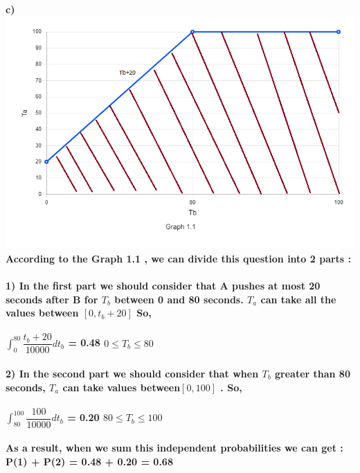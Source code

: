 \documentclass[12pt]{article}
\begin{document}
\paragraph{c)
\\ {\hspace*{100}}\includegraphics[scale=0.5]{Graph 1.1}
\\ According to the Graph 1.1 , we can divide this question into 2 parts :
\\\\ 1) In the first part we should consider that A pushes at most 20 seconds after B  for $T_{b}$ between 0 and 80 seconds. $T_{a}$ can take all the values between $[0 , t_{b}+20]$ So, 
\\\\ {\hspace*{50}} \(\int_{0}^{80} \dfrac{t_{b} + 20}{10000} dt_{b}\) = 0.48  {\hspace*{30}} $0\leq T_{b} \leq 80$
\\\\ 2) In the second part we should consider that when $T_{b}$ greater than 80 seconds, $T_{a}$ can take values between$[0,100]$ . So,
\\\\ {\hspace*{50}} \(\int_{80}^{100} \dfrac{100}{10000} dt_{b}\) = 0.20 {\hspace*{30}} $80\leq T_{b} \leq 100$
\\\\ As a result, when we sum this independent probabilities we can get : 
\\ {\hspace*{50}} P(1) + P(2) = 0.48 + 0.20 = 0.68
}
\newpage
\end{document}
